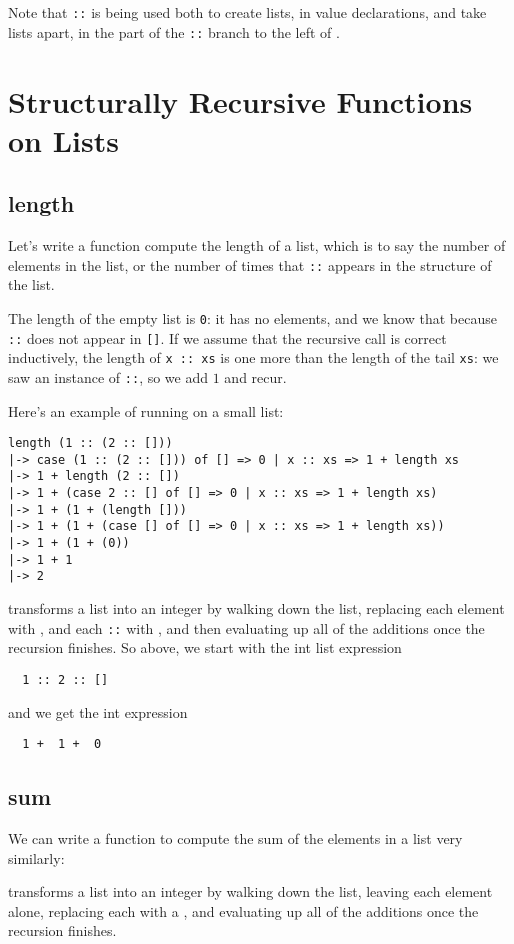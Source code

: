 \documentclass[11pt]{article}
\begin{document}
Note that \verb|::| is being used both to create lists, in value
declarations, and take lists apart, in the part of the \verb|::| branch to
the left of \sml{=>}.

\section{Structurally Recursive Functions on Lists}

\subsection{length}
Let's write a function compute the length of a list, which is to say the
number of elements in the list, or the number of times that \verb|::|
appears in the structure of the list.


The length of the empty list is \verb|0|: it has no elements, and we know
that because \verb|::| does not appear in \verb|[]|. If we assume that the
recursive call is correct inductively, the length of \verb|x :: xs| is one
more than the length of the tail \verb|xs|: we saw an instance of
\verb|::|, so we add $1$ and recur.

Here's an example of  running on a small list:

\begin{verbatim}
length (1 :: (2 :: []))
|-> case (1 :: (2 :: [])) of [] => 0 | x :: xs => 1 + length xs
|-> 1 + length (2 :: [])
|-> 1 + (case 2 :: [] of [] => 0 | x :: xs => 1 + length xs)
|-> 1 + (1 + (length []))
|-> 1 + (1 + (case [] of [] => 0 | x :: xs => 1 + length xs))
|-> 1 + (1 + (0))
|-> 1 + 1
|-> 2
\end{verbatim}

 transforms a list into an integer by walking down the list,
replacing each element with , and each \texttt{::} with \sml{+}, and
then evaluating up all of the additions once the recursion finishes. So
above, we start with the int list expression
\begin{verbatim}
  1 :: 2 :: []
\end{verbatim}
and we get the int expression
\begin{verbatim}
  1 +  1 +  0
\end{verbatim}

\subsection{sum}
We can write a function to compute the sum of the elements in a list very
similarly:

 transforms a list into an integer by walking down the list,
leaving each element alone, replacing each \sml{::} with a \sml{+}, and
evaluating up all of the additions once the recursion finishes.
\end{document}
